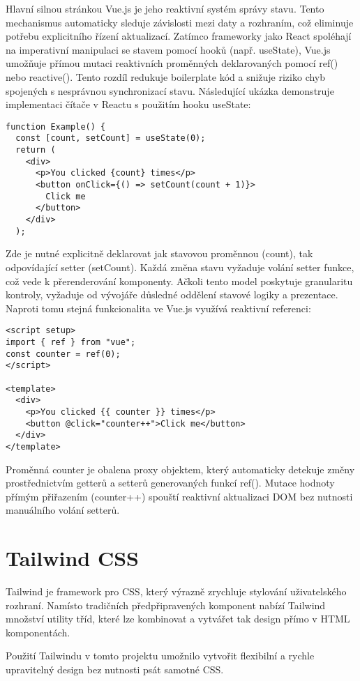 Hlavní silnou stránkou Vue.js je jeho reaktivní systém správy stavu. Tento mechanismus automaticky sleduje závislosti mezi daty a rozhraním, což eliminuje potřebu explicitního řízení aktualizací.
Zatímco frameworky jako React spoléhají na imperativní manipulaci se stavem pomocí hooků (např. useState), Vue.js umožňuje přímou mutaci reaktivních proměnných deklarovaných pomocí ref() nebo reactive(). Tento rozdíl redukuje boilerplate kód a snižuje riziko chyb spojených s nesprávnou synchronizací stavu. Následující ukázka demonstruje implementaci čítače v Reactu s použitím hooku useState:
\begin{lstlisting}
function Example() {
  const [count, setCount] = useState(0);
  return (
    <div>
      <p>You clicked {count} times</p>
      <button onClick={() => setCount(count + 1)}>
        Click me
      </button>
    </div>
  );
\end{lstlisting}
Zde je nutné explicitně deklarovat jak stavovou proměnnou (count), tak odpovídající setter (setCount). Každá změna stavu vyžaduje volání setter funkce, což vede k přerenderování komponenty. Ačkoli tento model poskytuje granularitu kontroly, vyžaduje od vývojáře důsledné oddělení stavové logiky a prezentace. Naproti tomu stejná funkcionalita ve Vue.js využívá reaktivní referenci:
\begin{lstlisting}
<script setup>
import { ref } from "vue";
const counter = ref(0);
</script>

<template>
  <div>
    <p>You clicked {{ counter }} times</p>
    <button @click="counter++">Click me</button>
  </div>
</template>
\end{lstlisting}
Proměnná counter je obalena proxy objektem, který automaticky detekuje změny prostřednictvím getterů a setterů generovaných funkcí ref(). Mutace hodnoty přímým přiřazením (counter++) spouští reaktivní aktualizaci DOM bez nutnosti manuálního volání setterů.

\section{Tailwind CSS}
Tailwind je framework pro CSS, který výrazně zrychluje stylování uživatelského rozhraní. Namísto tradičních předpřipravených komponent nabízí Tailwind množství utility tříd, které lze kombinovat a vytvářet tak design přímo v HTML komponentách.

Použití Tailwindu v tomto projektu umožnilo vytvořit flexibilní a rychle upravitelný design bez nutnosti psát samotné CSS.

